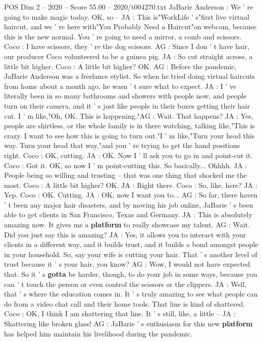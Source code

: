 \begin{textsample}{POS Dim 2 – 2020 – Score 55.00 – 2020/t004270.txt}
JaBarie Anderson : We ' re going to make magic today.
OK, so -- JA : This is"WorkLife ' s"first live virtual haircut, and we ' re here with"You Probably Need a Haircut"on webcam, because this is the new normal.
You ' re going to need a mirror, a comb and scissors.
Coco : I have scissors, they ' re the dog scissors.
AG : Since I don ' t have hair, our producer Coco volunteered to be a guinea pig.
JA : So cut straight across, a little bit higher.
Coco : A little bit higher?
OK.
AG : Before the pandemic, JaBarie Anderson was a freelance stylist.
So when he tried doing virtual haircuts from home about a month ago, he wasn ' t sure what to expect.
JA : I ' ve literally been in so many bathrooms and showers with people now, and people turn on their camera, and it ' s just like people in their boxes getting their hair cut.
I ' m like,"Oh, OK.
This is happening."AG : Wait.
That happens?
JA : Yes, people are shirtless, or the whole family is in there watching, talking like,"This is crazy.
I want to see how this is going to turn out."I ' m like,"Turn your head this way.
Turn your head that way,"and you ' re trying to get the hand positions right.
Coco : OK, cutting.
JA : OK.
Now I ' ll ask you to go in and point-cut it.
Coco : Got it.
OK, so now I ' m point-cutting this.
So basically...
Ohhhh.
JA : People being so willing and trusting -- that was one thing that shocked me the most.
Coco : A little bit higher?
OK.
JA : Right there.
Coco : So, like, here?
JA : Yep.
Coco : OK.
Cutting.
JA : OK, now I want you to...
AG : So far, there haven ' t been any major hair disasters, and by moving his job online, JaBarie ' s been able to get clients in San Francisco, Texas and Germany.
JA : This is absolutely amazing now.
It gives me a \textbf{platform} to really showcase my talent.
AG : Wait.
Did you just say this is amazing?
JA : Yes, it allows you to interact with your clients in a different way, and it builds trust, and it builds a bond amongst people in your household.
So, say your wife is cutting your hair.
That ' s another level of trust because it ' s your hair, you know?
AG : Wow, I would not have expected that.
So it ' s \textbf{gotta} be harder, though, to do your job in some ways, because you can ' t touch the person or even control the scissors or the clippers.
JA : Well, that ' s where the education comes in.
It ' s truly amazing to see what people can do from a video chat call and their home tools.
That line is kind of shattered.
Coco : OK, I think I am shattering that line.
It ' s still, like, a little -- JA : Shattering like broken glass!
AG : JaBarie ' s enthusiasm for this new \textbf{platform} has helped him maintain his livelihood during the pandemic.

\end{textsample}
